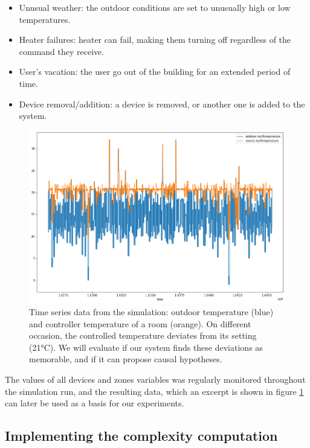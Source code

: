 \documentclass[conference]{IEEEtran}
\begin{document}
\begin{itemize}
    \item Unusual weather: the outdoor conditions are set to unusually high or
        low temperatures.
    \item Heater failures: heater can fail, making them turning off regardless
        of the command they receive.
    \item User's vacation: the user go out of the building for an extended
        period of time.
    \item Device removal/addition: a device is removed, or another one is added
        to the system.
\end{itemize}


\begin{figure}[ht]
  \includegraphics[width=\linewidth]{figures/ts_example}
  \caption{Time series data from the simulation: outdoor temperature (blue) and
controller temperature of a room (orange). On different occasion, the
    controlled temperature deviates from its setting (21°C). We will evaluate if
  our system finds these deviations as memorable, and if it can propose causal
  hypotheses.}
  \label{fig:ts_example}
\end{figure}

The values of all devices and zones variables was regularly monitored throughout
the simulation run, and the resulting data, which an excerpt is shown in figure
\ref{fig:ts_example} can later be used as a basis for our experiments.


\subsection{Implementing the complexity computation}
\end{document}
